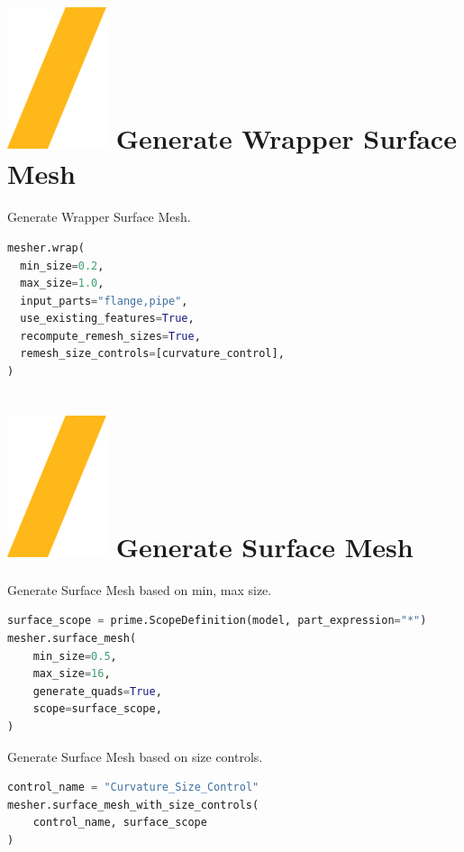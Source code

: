 \documentclass[9pt,landscape]{article}
\begin{document}
\begin{multicols}{3}
\section{\includegraphics[height=\fontcharht\font`\S]{slash.png} Generate Wrapper Surface Mesh}
Generate Wrapper Surface Mesh.
\begin{lstlisting}[language=Python]
mesher.wrap(
  min_size=0.2,
  max_size=1.0,
  input_parts="flange,pipe",
  use_existing_features=True,
  recompute_remesh_sizes=True,
  remesh_size_controls=[curvature_control],
)
\end{lstlisting}

\section{\includegraphics[height=\fontcharht\font`\S]{slash.png} Generate Surface Mesh}
Generate Surface Mesh based on min, max size. 
\begin{lstlisting}[language=Python]
surface_scope = prime.ScopeDefinition(model, part_expression="*")
mesher.surface_mesh(
    min_size=0.5,
    max_size=16,
    generate_quads=True,
    scope=surface_scope,
)
\end{lstlisting}

Generate Surface Mesh based on size controls.  
\begin{lstlisting}[language=Python]
control_name = "Curvature_Size_Control"
mesher.surface_mesh_with_size_controls(
    control_name, surface_scope
)
\end{lstlisting}


\end{multicols}
\end{document}
